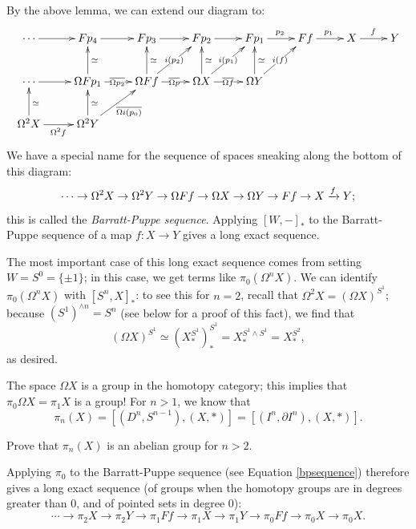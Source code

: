 By the above lemma, we can extend our diagram to:
\begin{equation*}
    \xymatrix{
	\cdots\ar[r] & Fp_4\ar[r] & Fp_3 \ar[r] & Fp_2\ar[r] & Fp_1\ar[r]^{p_2} & Ff\ar[r]^{p_1} & X\ar[r]^{f} & Y\\
    \cdots\ar[r] & \Omega Fp_1\ar[r]|{\overline{\Omega p_2}}\ar[u]_{\simeq} & \Omega Ff\ar[u]_{\simeq}\ar[ur]|{i(p_2)}\ar[r]|{\overline{\Omega p}} & \Omega X\ar[r]|{\overline{\Omega f}}\ar[u]_{\simeq}\ar[ur]|{i(p_1)} & \Omega Y\ar[u]_\simeq \ar[ur]|{i(f)} & &\\
	\Omega^2 X\ar[u]_{\simeq}\ar[r]_{\Omega^2 f} & \Omega^2 Y\ar[u]_{\simeq}\ar[ur]_{\overline{\Omega i(p_0)}} & & &
    }
\end{equation*}
We have a special name for the sequence of spaces sneaking along the bottom of this diagram:
$$\cdots\to \Omega^2 X \to \Omega^2 Y \to \Omega Ff \to \Omega X \to \Omega Y \to Ff \to X \xrightarrow{{f}} Y;$$
this is called the \emph{Barratt-Puppe sequence}.
Applying $[W,-]_\ast$ to the Barratt-Puppe sequence of a map $f:X\to Y$ gives a long exact sequence.

The most important case of this long exact sequence comes from setting $W = S^0=\{\pm 1\}$;
in this case, we get terms like $\pi_0(\Omega^n X)$.
We can identify $\pi_0(\Omega^n X)$ with $[S^n,X]_\ast$: to see this for $n=2$,
recall that $\Omega^2 X = (\Omega X)^{S^1}$; because $(S^1)^{\wedge n} = S^n$ (see below for a proof of this fact), 
we find that
\begin{equation}\label{bpsequence}
(\Omega X)^{S^1} \simeq (X^{S^1}_\ast)^{S^1}_\ast = X_\ast^{S^1\wedge S^1} = X_\ast^{S^2},
\end{equation}
as desired.

The space $\Omega X$ is a group in the homotopy category; this implies that
$\pi_0 \Omega X = \pi_1 X$ is a group!
For $n>1$, we know that
$$\pi_n(X) = [(D^n,S^{n-1}),(X,\ast)] = [(I^n,\partial I^n),(X,\ast)].$$
\begin{exercise}
    Prove that $\pi_n(X)$ is an abelian group for $n>2$.
\end{exercise}
Applying $\pi_0$ to the Barratt-Puppe sequence (see Equation \ref{bpsequence}) therefore gives a long exact sequence
(of groups when the homotopy groups are in degrees greater than $0$, and of pointed sets in degree $0$):
$$\cdots\to \pi_2 X\to \pi_2 Y\to \pi_1 Ff\to \pi_1 X\to\pi_1 Y\to\pi_0 Ff\to\pi_0 X\to \pi_0 X.$$

